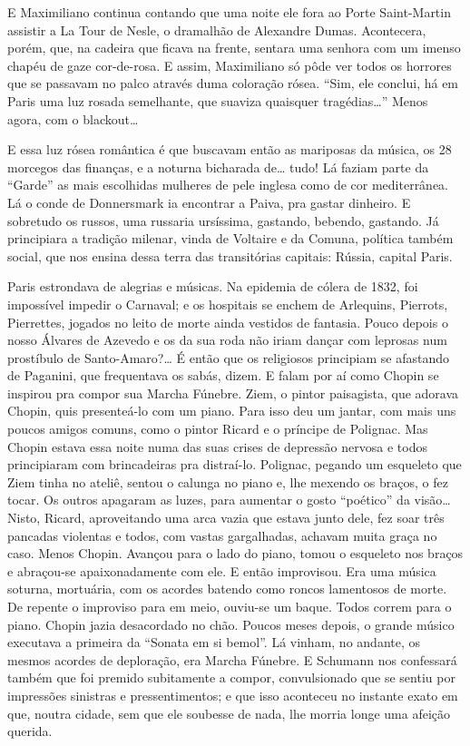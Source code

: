 E Maximiliano continua contando que uma noite ele fora ao Porte
Saint-Martin assistir a La Tour de Nesle, o dramalhão de Alexandre
Dumas. Acontecera, porém, que, na cadeira que ficava na frente, sentara
uma senhora com um imenso chapéu de gaze cor-de-rosa. E assim,
Maximiliano só pôde ver todos os horrores que se passavam no palco
através duma coloração rósea. ``Sim, ele conclui, há em Paris uma luz
rosada semelhante, que suaviza quaisquer tragédias\ldots{}'' Menos agora, com
o blackout\ldots{}

E essa luz rósea romântica é que buscavam então as mariposas da música,
os 28 morcegos das finanças, e a noturna bicharada de\ldots{} tudo! Lá faziam
parte da ``Garde'' as mais escolhidas mulheres de pele inglesa como de
cor mediterrânea. Lá o conde de Donnersmark ia encontrar a Paiva, pra
gastar dinheiro. E sobretudo os russos, uma russaria ursíssima,
gastando, bebendo, gastando. Já principiara a tradição milenar, vinda de
Voltaire e da Comuna, política também social, que nos ensina dessa terra
das transitórias capitais: Rússia, capital Paris.

Paris estrondava de alegrias e músicas. Na epidemia de cólera de 1832,
foi impossível impedir o Carnaval; e os hospitais se enchem de
Arlequins, Pierrots, Pierrettes, jogados no leito de morte ainda
vestidos de fantasia. Pouco depois o nosso Álvares de Azevedo e os da
sua roda não iriam dançar com leprosas num prostíbulo de Santo-Amaro?\ldots{}
É então que os religiosos principiam se afastando de Paganini, que
frequentava os sabás, dizem. E falam por aí como Chopin se inspirou pra
compor sua Marcha Fúnebre. Ziem, o pintor paisagista, que adorava
Chopin, quis presenteá-lo com um piano. Para isso deu um jantar, com
mais uns poucos amigos comuns, como o pintor Ricard e o príncipe de
Polignac. Mas Chopin estava essa noite numa das suas crises de depressão
nervosa e todos principiaram com brincadeiras pra distraí-lo. Polignac,
pegando um esqueleto que Ziem tinha no ateliê, sentou o calunga no piano
e, lhe mexendo os braços, o fez tocar. Os outros apagaram as luzes, para
aumentar o gosto ``poético'' da visão\ldots{} Nisto, Ricard, aproveitando uma
arca vazia que estava junto dele, fez soar três pancadas violentas e
todos, com vastas gargalhadas, achavam muita graça no caso. Menos
Chopin. Avançou para o lado do piano, tomou o esqueleto nos braços e
abraçou-se apaixonadamente com ele. E então improvisou. Era uma música
soturna, mortuária, com os acordes batendo como roncos lamentosos de
morte. De repente o improviso para em meio, ouviu-se um baque. Todos
correm para o piano. Chopin jazia desacordado no chão. Poucos meses
depois, o grande músico executava a primeira da ``Sonata em si bemol''.
Lá vinham, no andante, os mesmos acordes de deploração, era Marcha
Fúnebre. E Schumann nos confessará também que foi premido subitamente a
compor, convulsionado que se sentiu por impressões sinistras e
pressentimentos; e que isso aconteceu no instante exato em que, noutra
cidade, sem que ele soubesse de nada, lhe morria longe uma afeição
querida.


